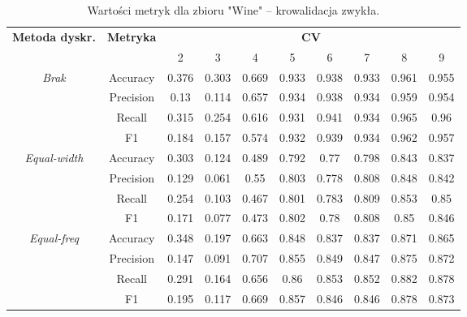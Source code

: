         \begin{table}[H]
        \center
        \caption{Wartości metryk dla zbioru "Wine" -- krowalidacja zwykła.}
        \begin{tabular}{|c|c|c|c|c|c|c|c|c|c|}
            \hline
            \multirow{2}{*}{\textbf{Metoda dyskr.}} & \multirow{2}{*}{\textbf{Metryka}} & \multicolumn{8}{|c|}{\textbf{CV}} \\ \cline{3-10}
                            &  & 2 & 3 & 4 & 5 & 6 & 7 & 8 & 9 \\ \hline
            \multirow{4}{*}{\textit{Brak}}  & Accuracy & 0.376 & 0.303 & 0.669 & 0.933 & 0.938 & 0.933 & 0.961 & 0.955 \\ \cline{2-10}
                                             & Precision & 0.13 & 0.114 & 0.657 & 0.934 & 0.938 & 0.934 & 0.959 & 0.954 \\ \cline{2-10}
                                             & Recall & 0.315 & 0.254 & 0.616 & 0.931 & 0.941 & 0.934 & 0.965 & 0.96 \\ \cline{2-10}
                                             & F1 & 0.184 & 0.157 & 0.574 & 0.932 & 0.939 & 0.934 & 0.962 & 0.957 \\ \hline \hline


                                            \multirow{4}{*}{\textit{Equal-width}}  & Accuracy & 0.303 & 0.124 & 0.489 & 0.792 & 0.77 & 0.798 & 0.843 & 0.837 \\ \cline{2-10}
                                             & Precision & 0.129 & 0.061 & 0.55 & 0.803 & 0.778 & 0.808 & 0.848 & 0.842 \\ \cline{2-10}
                                             & Recall & 0.254 & 0.103 & 0.467 & 0.801 & 0.783 & 0.809 & 0.853 & 0.85 \\ \cline{2-10}
                                             & F1 & 0.171 & 0.077 & 0.473 & 0.802 & 0.78 & 0.808 & 0.85 & 0.846 \\ \hline \hline


                                            \multirow{4}{*}{\textit{Equal-freq}}  & Accuracy & 0.348 & 0.197 & 0.663 & 0.848 & 0.837 & 0.837 & 0.871 & 0.865 \\ \cline{2-10}
                                             & Precision & 0.147 & 0.091 & 0.707 & 0.855 & 0.849 & 0.847 & 0.875 & 0.872 \\ \cline{2-10}
                                             & Recall & 0.291 & 0.164 & 0.656 & 0.86 & 0.853 & 0.852 & 0.882 & 0.878 \\ \cline{2-10}
                                             & F1 & 0.195 & 0.117 & 0.669 & 0.857 & 0.846 & 0.846 & 0.878 & 0.873 \\ \hline \hline



\end{tabular}
\end{table}
